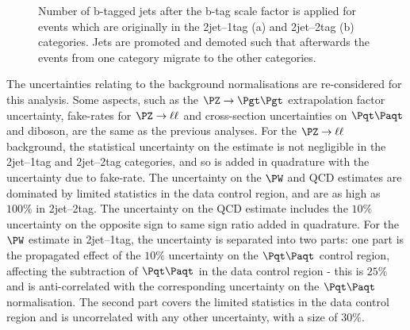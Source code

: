 \begin{figure}
\begin{center}

\end{center}
\caption[Number of b-tagged jets after the b-tag scale factor is applied for events which
are originally in the 2jet--1tag (a) and 2jet--2tag (b) categories.]{
Number of b-tagged jets after the b-tag scale factor is applied for events which
are originally in the 2jet--1tag (a) and 2jet--2tag (b) categories. Jets
are promoted and demoted such that afterwards the events from one category
migrate to the other categories.}
\label{fig:Hhhbtagsystematic}
\end{figure}

The uncertainties relating to the background normalisations are re-considered
for this analysis. Some aspects, such as the $\ZToTauTau$ extrapolation factor
uncertainty, fake-rates for $\PZ\to\ell\ell$ and cross-section uncertainties on
$\ttbar$ and diboson, are the same as the previous analyses. For the
$\PZ\to\ell\ell$ background, the statistical uncertainty on the estimate is not
negligible in the 2jet--1tag and 2jet--2tag categories, and so is added in
quadrature with the uncertainty due to fake-rate. The uncertainty on the
$\PW$ and QCD estimates are dominated by limited statistics in the data control
region, and are as high as $100\%$ in 2jet--2tag. The uncertainty on the QCD
estimate includes the $10\%$ uncertainty on the opposite sign to same sign ratio
added in quadrature. For the $\PW$ estimate in 2jet--1tag, the uncertainty is
separated into two parts: one part is the propagated effect of the $10\%$
uncertainty on the $\ttbar$ control region, affecting the subtraction of
$\ttbar$ in the data control region - this is $25\%$ and is anti-correlated with
the corresponding uncertainty on the $\ttbar$ normalisation. The second part
covers the limited statistics in the data control region and is uncorrelated
with any other uncertainty, with a size of $30\%$.


